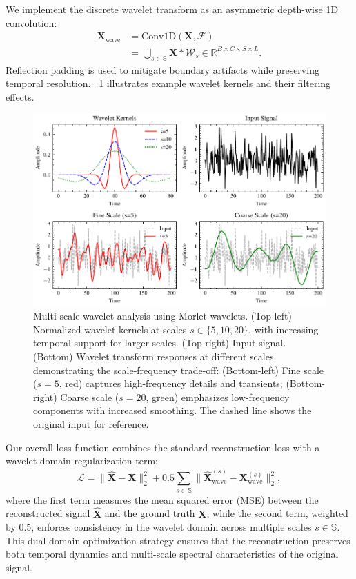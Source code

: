 \documentclass[conference]{IEEEtran}
\begin{document}
We implement the discrete wavelet transform as an asymmetric depth-wise 1D convolution:
\begin{equation}
    \begin{aligned}
        \mathbf{X}_{\text{wave}} & = \text{Conv1D}(\mathbf{X}, \mathcal{F})                                                            \\
                                 & = \bigcup_{s\in\mathbb{S}} \mathbf{X}\ast \mathcal{W}_s \in \mathbb{R}^{B\times C\times S\times L}.
    \end{aligned}
\end{equation}
Reflection padding is used to mitigate boundary artifacts while preserving temporal resolution. \figurename~\ref{fig:wavelet-transform} illustrates example wavelet kernels and their filtering effects.

\begin{figure}[htbp]
    \centering
    \includegraphics[width=\linewidth]{wavelet-transform.pdf}
    \caption{Multi-scale wavelet analysis using Morlet wavelets. (Top-left) Normalized wavelet kernels at scales $s \in \{5, 10, 20\}$, with increasing temporal support for larger scales. (Top-right) Input signal. (Bottom) Wavelet transform responses at different scales demonstrating the scale-frequency trade-off: (Bottom-left) Fine scale ($s=5$, red) captures high-frequency details and transients; (Bottom-right) Coarse scale ($s=20$, green) emphasizes low-frequency components with increased smoothing. The dashed line shows the original input for reference.}
    \label{fig:wavelet-transform}
\end{figure}

Our overall loss function combines the standard reconstruction loss with a wavelet-domain regularization term:
\begin{equation}
    \mathcal{L} = \|\mathbf{\hat{X}} - \mathbf{X}\|_2^2 + 0.5\sum_{s\in\mathbb{S}} \|\mathbf{\hat{X}}_{\text{wave}}^{(s)} - \mathbf{X}_{\text{wave}}^{(s)}\|_2^2,
\end{equation}
where the first term measures the mean squared error (MSE) between the reconstructed signal $\mathbf{\hat{X}}$ and the ground truth $\mathbf{X}$, while the second term, weighted by 0.5, enforces consistency in the wavelet domain across multiple scales $s \in \mathbb{S}$. This dual-domain optimization strategy ensures that the reconstruction preserves both temporal dynamics and multi-scale spectral characteristics of the original signal.
\end{document}
